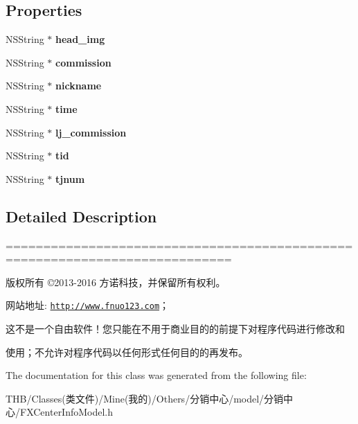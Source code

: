 \subsection*{Properties}
\begin{DoxyCompactItemize}
\item 
\mbox{\label{interface_f_x_center_info_model_af2d518175ce6200a87a3068a5461348e}} 
N\+S\+String $\ast$ {\bfseries head\+\_\+img}
\item 
\mbox{\label{interface_f_x_center_info_model_ad74c42f9eca448bc0c3e8aafccd9d590}} 
N\+S\+String $\ast$ {\bfseries commission}
\item 
\mbox{\label{interface_f_x_center_info_model_ab9d84f0fae17b8a7f9d3a6edff6a75b2}} 
N\+S\+String $\ast$ {\bfseries nickname}
\item 
\mbox{\label{interface_f_x_center_info_model_a5275cfc964b10280b49d401dbe99abfd}} 
N\+S\+String $\ast$ {\bfseries time}
\item 
\mbox{\label{interface_f_x_center_info_model_ac81240e8752d6978ee85b488b57debb7}} 
N\+S\+String $\ast$ {\bfseries lj\+\_\+commission}
\item 
\mbox{\label{interface_f_x_center_info_model_a20ef686ba2b9ff3d767b8fee80bb054a}} 
N\+S\+String $\ast$ {\bfseries tid}
\item 
\mbox{\label{interface_f_x_center_info_model_a7c416b1bbf4a1c84a1c808849ee90134}} 
N\+S\+String $\ast$ {\bfseries tjnum}
\end{DoxyCompactItemize}


\subsection{Detailed Description}
============================================================================

版权所有 ©2013-\/2016 方诺科技，并保留所有权利。

网站地址\+: \href{http://www.fnuo123.com}{\tt http\+://www.\+fnuo123.\+com}； 



这不是一个自由软件！您只能在不用于商业目的的前提下对程序代码进行修改和

使用；不允许对程序代码以任何形式任何目的的再发布。 

 

The documentation for this class was generated from the following file\+:\begin{DoxyCompactItemize}
\item 
T\+H\+B/\+Classes(类文件)/\+Mine(我的)/\+Others/分销中心/model/分销中心/F\+X\+Center\+Info\+Model.\+h\end{DoxyCompactItemize}
